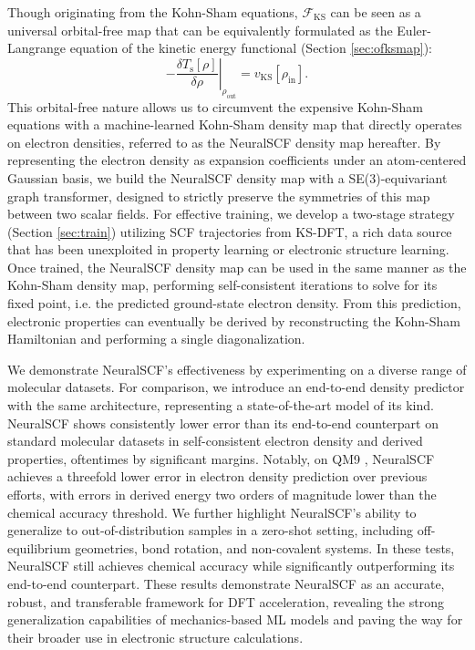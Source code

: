 \documentclass[%
reprint,
superscriptaddress,
bibnotes,
amsmath,amssymb,
aps,
floatfix, %
]{revtex4-2}
\begin{document}
Though originating from the Kohn-Sham equations, $\mathcal{F}_\text{KS}$ can be seen as a universal orbital-free map that can be equivalently formulated as the Euler-Langrange equation of the kinetic energy functional  (Section \ref{sec:ofksmap}):
\begin{equation}
  \left.-\frac{\delta T_\text{s}[\rho]}{\delta \rho} \right\rvert_{\rho_\text{out}}= v_\text{KS}[\rho_\text{in}].
  \label{eq:ksmap}
\end{equation}
 This orbital-free nature allows us to circumvent the expensive Kohn-Sham equations with a machine-learned Kohn-Sham density map that directly operates on electron densities, referred to as the NeuralSCF density map hereafter. By representing the electron density as expansion coefficients under an atom-centered Gaussian basis, we build the NeuralSCF density map with a SE(3)-equivariant graph transformer, designed to strictly preserve the symmetries of this map between two scalar fields. For effective training, we develop a two-stage strategy (Section \ref{sec:train}) utilizing SCF trajectories from KS-DFT, a rich data source that has been unexploited in property learning or electronic structure learning. Once trained, the NeuralSCF density map can be used in the same manner as the Kohn-Sham density map, performing self-consistent iterations to solve for its fixed point, i.e. the predicted ground-state electron density. From this prediction, electronic properties can eventually be derived by reconstructing the Kohn-Sham Hamiltonian and performing a single diagonalization.

We demonstrate NeuralSCF's effectiveness by experimenting on a diverse range of molecular datasets. For comparison, we introduce an end-to-end density predictor with the same architecture, representing a state-of-the-art model of its kind. NeuralSCF  shows consistently lower error than its end-to-end counterpart on standard molecular datasets in self-consistent electron density and derived properties, oftentimes by significant margins. Notably, on QM9 \cite{ramakrishnan2014quantum}, NeuralSCF achieves a threefold lower error in electron density prediction over previous efforts, with errors in derived energy two orders of magnitude lower than the chemical accuracy threshold. We further highlight NeuralSCF's ability to generalize to out-of-distribution samples in a zero-shot setting, including off-equilibrium geometries, bond rotation, and non-covalent systems. In these tests, NeuralSCF still achieves chemical accuracy while significantly outperforming its end-to-end counterpart. These results demonstrate NeuralSCF as an accurate, robust, and transferable framework for DFT acceleration, revealing the strong generalization capabilities of mechanics-based ML models and paving the way for their broader use in electronic structure calculations.
\end{document}

